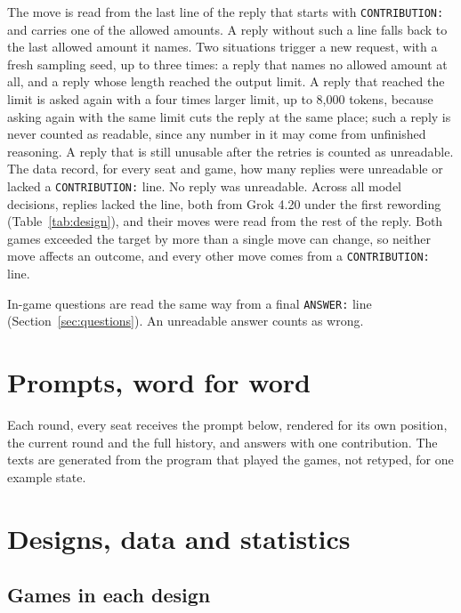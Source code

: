 \documentclass[10pt]{article}
\let\plainsubsection\subsection
\renewcommand{\subsection}{\FloatBarrier\needspace{8\baselineskip}\plainsubsection}
\let\plainsection\section
\renewcommand{\section}{\FloatBarrier\needspace{12\baselineskip}\plainsection}  %
\begin{document}
The move is read from the last line of the reply that starts with \texttt{CONTRIBUTION:} and carries one of the allowed amounts. A reply without such a line falls back to the last allowed amount it names. Two situations trigger a new request, with a fresh sampling seed, up to three times: a reply that names no allowed amount at all, and a reply whose length reached the output limit. A reply that reached the limit is asked again with a four times larger limit, up to 8,000 tokens, because asking again with the same limit cuts the reply at the same place; such a reply is never counted as readable, since any number in it may come from unfinished reasoning. A reply that is still unusable after the retries is counted as unreadable. The data record, for every seat and game, how many replies were unreadable or lacked a \texttt{CONTRIBUTION:} line. No reply was unreadable. Across all \CntDecisions{} model decisions, \CntParseFail{} replies lacked the line, both from Grok 4.20 under the first rewording (Table~\ref{tab:design}), and their moves were read from the rest of the reply. Both games exceeded the target by more than a single move can change, so neither move affects an outcome, and every other move comes from a \texttt{CONTRIBUTION:} line.

In-game questions are read the same way from a final \texttt{ANSWER:} line (Section~\ref{sec:questions}). An unreadable answer counts as wrong.

\section{Prompts, word for word}
\label{sec:prompts}

Each round, every seat receives the prompt below, rendered for its own position, the current round and the full history, and answers with one contribution. The texts are generated from the program that played the games, not retyped, for one example state.



\section{Designs, data and statistics}
\label{sec:design}

\subsection{Games in each design}
\end{document}
